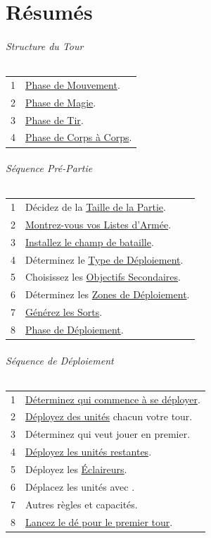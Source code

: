 

\hypertarget{summaries}{\part{Résumés}}

{\normalfontsize

\vspace*{10pt}
\begin{minipage}[t]{.35\linewidth}

\paragraph{Structure du Tour}

\begin{tabular}{c|l}
1 & \hyperlink{movementphase}{Phase de Mouvement}. \tabularnewline
2 & \hyperlink{magicphase}{Phase de Magie}. \tabularnewline
3 & \hyperlink{shootingphase}{Phase de Tir}. \tabularnewline
4 & \hyperlink{closecombatphase}{Phase de Corps à Corps}. \tabularnewline
\end{tabular}

\vspace*{20pt}
\paragraph{Séquence Pré-Partie}

\begin{tabular}{c|l}
1 & Décidez de la \hyperlink{gamesize}{Taille de la Partie}. \tabularnewline
2 & \hyperlink{sharearmylist}{Montrez-vous vos Listes d'Armée}. \tabularnewline
3 & \hyperlink{buildbattlefield}{Installez le champ de bataille}. \tabularnewline
4 & Déterminez le \hyperlink{deploymenttype}{Type de Déploiement}. \tabularnewline
5 & Choisissez les \hyperlink{secondaryobjectives}{Objectifs Secondaires}. \tabularnewline
6 & Déterminez les \hyperlink{deploymentzones}{Zones de Déploiement}. \tabularnewline
7 & \hyperlink{generatespells}{Générez les Sorts}. \tabularnewline
8 & \hyperlink{deploymentphase}{Phase de Déploiement}. \tabularnewline
\end{tabular}

\vspace*{20pt}
\paragraph{Séquence de Déploiement}

\begin{tabular}{c|l}
1 & \hyperlink{whodeploysfirst}{Déterminez qui commence à se déployer}. \tabularnewline
2 & \hyperlink{deployunits}{Déployez des unités} chacun votre tour. \tabularnewline
3 & Déterminez qui veut jouer en premier. \tabularnewline
4 & \hyperlink{deployremainingunits}{Déployez les unités restantes}. \tabularnewline
5 & Déployez les \hyperlink{scout}{Éclaireurs}. \tabularnewline
6 & Déplacez les unités avec \hyperlink{vanguard}{\vanguard{}}. \tabularnewline
7 & Autres règles et capacités. \tabularnewline
8 & \hyperlink{rollforfirstturn}{Lancez le dé pour le premier tour}. \tabularnewline
\end{tabular}


\end{minipage}}
